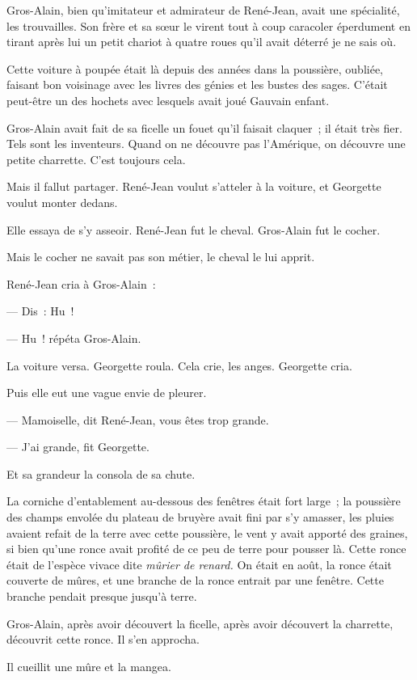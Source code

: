 \documentclass[french,twoside]{book} %
\begin{document}
Gros-Alain, bien qu’imitateur et admirateur de René-Jean, avait une spécialité, les trouvailles. Son frère et sa sœur le virent tout à coup caracoler éperdument en tirant après lui un petit chariot à quatre roues qu’il avait déterré je ne sais où.\par
Cette voiture à poupée était là depuis des années dans la poussière, oubliée, faisant bon voisinage avec les livres des génies et les bustes des sages. C’était peut-être un des hochets avec lesquels avait joué Gauvain enfant.\par
Gros-Alain avait fait de sa ficelle un fouet qu’il faisait claquer ; il était très fier. Tels sont les inventeurs. Quand on ne découvre pas l’Amérique, on découvre une petite charrette. C’est toujours cela.\par
Mais il fallut partager. René-Jean voulut s’atteler à la voiture, et Georgette voulut monter dedans.\par
Elle essaya de s’y asseoir. René-Jean fut le cheval. Gros-Alain fut le cocher.\par
Mais le cocher ne savait pas son métier, le cheval le lui apprit.\par
René-Jean cria à Gros-Alain :\par
— Dis : Hu !\par
— Hu ! répéta Gros-Alain.\par
La voiture versa. Georgette roula. Cela crie, les anges. Georgette cria.\par
Puis elle eut une vague envie de pleurer.\par
 — Mamoiselle, dit René-Jean, vous êtes trop grande.\par
— J’ai grande, fit Georgette.\par
Et sa grandeur la consola de sa chute.\par
La corniche d’entablement au-dessous des fenêtres était fort large ; la poussière des champs envolée du plateau de bruyère avait fini par s’y amasser, les pluies avaient refait de la terre avec cette poussière, le vent y avait apporté des graines, si bien qu’une ronce avait profité de ce peu de terre pour pousser là. Cette ronce était de l’espèce vivace dite \emph{mûrier de renard.} On était en août, la ronce était couverte de mûres, et une branche de la ronce entrait par une fenêtre. Cette branche pendait presque jusqu’à terre.\par
Gros-Alain, après avoir découvert la ficelle, après avoir découvert la charrette, découvrit cette ronce. Il s’en approcha.\par
Il cueillit une mûre et la mangea.\par
\end{document}
